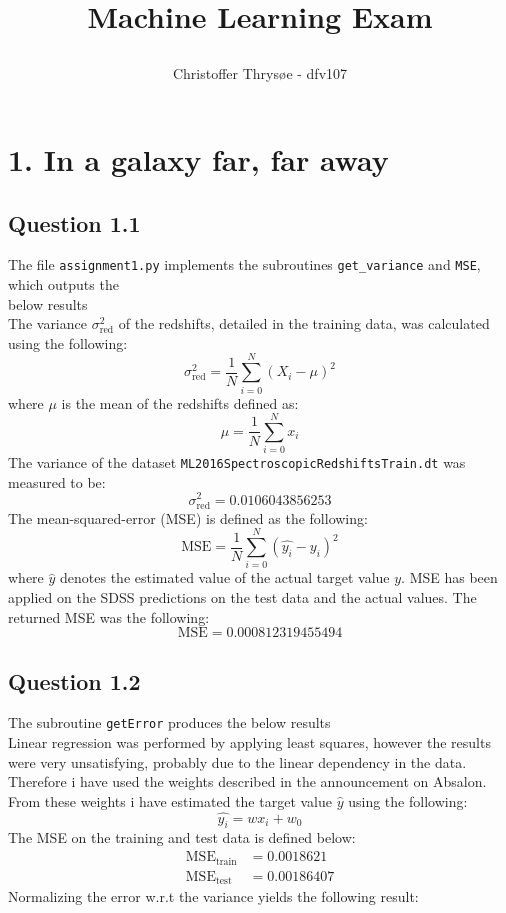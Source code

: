 \documentclass{article}
\title{
\vspace{1in}
\textmd{\textbf{Machine Learning Exam}} \\
\author{Christoffer Thrysøe - dfv107}
}
\begin{document}
\maketitle
{}
\section{1. In a galaxy far, far away}
\subsection{Question 1.1}
The file \texttt{assignment1.py} implements the subroutines \texttt{get\_variance} and \texttt{MSE}, which outputs the\\below results \\
The variance $\sigma^ 2_{\text{red}}$ of the redshifts, detailed in the training data, was calculated using the following:
\begin{equation}
\sigma^2_{\text{red}} = \dfrac{1}{N} \sum\limits_{i=0}^N(X_i-\mu)^2
\end{equation}
where $\mu$ is the mean of the redshifts defined as:
\begin{equation}
\mu = \dfrac{1}{N} \sum\limits_{i=0}^N x_i
\end{equation}
The variance of the dataset \texttt{ML2016SpectroscopicRedshiftsTrain.dt} was measured to be:
$$
\sigma^ 2_{\text{red}} = 0.0106043856253
$$
The mean-squared-error (MSE) is defined as the following:
\begin{equation}
\text{MSE} = \dfrac{1}{N} \sum\limits_{i=0}^N (\hat{y_i} - y_i)^2 
\end{equation}
where $\hat{y}$ denotes the estimated value of the actual target value $y$. 
MSE has been applied on the SDSS predictions on the test data and the actual values. The returned MSE was the following:
$$
\text{MSE} = 0.000812319455494
$$
\subsection{Question 1.2}
The subroutine \texttt{getError} produces the below results
\\
Linear regression was performed by applying least squares, however the results were very unsatisfying, probably due to the linear dependency in the data. Therefore i have used the weights described in the announcement on Absalon. From these weights i have estimated the target value $\hat{y}$ using the following:
\begin{equation}
\hat{y_i} = wx_i+w_0
\end{equation}
The MSE on the training and test data is defined below:
\begin{align*}
\text{MSE}_{\text{train}} &=  0.0018621 \\
\text{MSE}_{\text{test}} &= 0.00186407
\end{align*}
Normalizing the error w.r.t the variance yields the following result:
\end{document}
